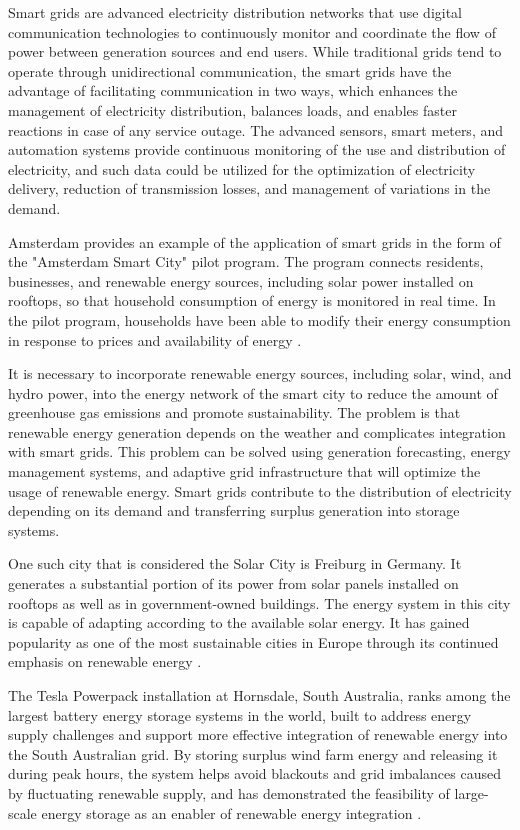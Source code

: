 \documentclass[pdflatex,sn-mathphys-num]{sn-jnl}%
\theoremstyle{thmstyleone}%
\theoremstyle{thmstyletwo}%
\theoremstyle{thmstylethree}%
\begin{document}
Smart grids are advanced electricity distribution networks that use digital communication technologies to continuously monitor and coordinate the flow of power between generation sources and end users. While traditional grids tend to operate through unidirectional communication, the smart grids have the advantage of facilitating communication in two ways, which enhances the management of electricity distribution, balances loads, and enables faster reactions in case of any service outage. The advanced sensors, smart meters, and automation systems provide continuous monitoring of the use and distribution of electricity, and such data could be utilized for the optimization of electricity delivery, reduction of transmission losses, and management of variations in the demand.

Amsterdam provides an example of the application of smart grids in the form of the "Amsterdam Smart City" pilot program. The program connects residents, businesses, and renewable energy sources, including solar power installed on rooftops, so that household consumption of energy is monitored in real time. In the pilot program, households have been able to modify their energy consumption in response to prices and availability of energy \cite{r79,r106}.

It is necessary to incorporate renewable energy sources, including solar, wind, and hydro power, into the energy network of the smart city to reduce the amount of greenhouse gas emissions and promote sustainability. The problem is that renewable energy generation depends on the weather and complicates integration with smart grids. This problem can be solved using generation forecasting, energy management systems, and adaptive grid infrastructure that will optimize the usage of renewable energy. Smart grids contribute to the distribution of electricity depending on its demand and transferring surplus generation into storage systems.

One such city that is considered the Solar City is Freiburg in Germany. It generates a substantial portion of its power from solar panels installed on rooftops as well as in government-owned buildings. The energy system in this city is capable of adapting according to the available solar energy. It has gained popularity as one of the most sustainable cities in Europe through its continued emphasis on renewable energy \cite{r80,r107}.

The Tesla Powerpack installation at Hornsdale, South Australia, ranks among the largest battery energy storage systems in the world, built to address energy supply challenges and support more effective integration of renewable energy into the South Australian grid. By storing surplus wind farm energy and releasing it during peak hours, the system helps avoid blackouts and grid imbalances caused by fluctuating renewable supply, and has demonstrated the feasibility of large-scale energy storage as an enabler of renewable energy integration \cite{r81,r108}.
\end{document}
